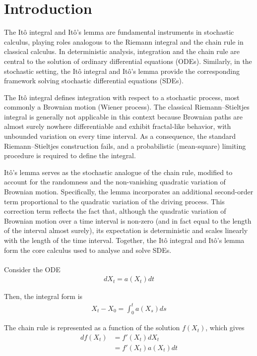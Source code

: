\section{Introduction}
The Itô integral and Itô’s lemma are fundamental instruments in stochastic calculus, playing roles analogous to the Riemann integral and the chain rule in classical calculus. In deterministic analysis, integration and the chain rule are central to the solution of ordinary differential equations (ODEs). Similarly, in the stochastic setting, the Itô integral and Itô’s lemma provide the corresponding framework solving stochastic differential equations (SDEs).

The Itô integral defines integration with respect to a stochastic process, most commonly a Brownian motion (Wiener process). The classical Riemann–Stieltjes integral is generally not applicable in this context because Brownian paths are almost surely nowhere differentiable and exhibit fractal-like behavior, with unbounded variation on every time interval. As a consequence, the standard Riemann–Stieltjes construction fails, and a probabilistic (mean-square) limiting procedure is required to define the integral.

Itô’s lemma serves as the stochastic analogue of the chain rule, modified to account for the randomness and the non-vanishing quadratic variation of Brownian motion. Specifically, the lemma incorporates an additional second-order term proportional to the quadratic variation of the driving process. This correction term reflects the fact that, although the quadratic variation of Brownian motion over a time interval is non-zero (and in fact equal to the length of the interval almost surely), its expectation is deterministic and scales linearly with the length of the time interval. Together, the Itô integral and Itô’s lemma form the core calculus used to analyse and solve SDEs.
\\\\
Consider the ODE
\begin{align*}
dX_t = a(X_t)dt
\end{align*}

Then, the integral form is
\begin{align*}
X_t - X_0 = \int_0^t a(X_s)ds
\end{align*}

The chain rule is represented as a function of the solution $f(X_t)$, which gives
\begin{align*}
df(X_t)&=f'(X_t)dX_t\\
&=f'(X_t)a(X_t)dt
\end{align*}

